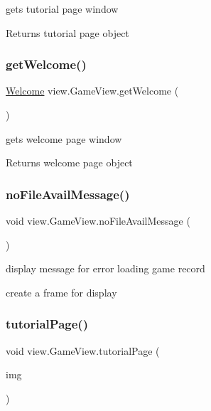 gets tutorial page window 

\begin{DoxyReturn}{Returns}
tutorial page object 
\end{DoxyReturn}
\hypertarget{classview_1_1_game_view_adaeb63e182332aee35ca0e0591332add}{}\label{classview_1_1_game_view_adaeb63e182332aee35ca0e0591332add} 
\subsubsection{\texorpdfstring{get\+Welcome()}{getWelcome()}}
{\footnotesize\ttfamily \hyperlink{classview_1_1_welcome}{Welcome} view.\+Game\+View.\+get\+Welcome (\begin{DoxyParamCaption}{ }\end{DoxyParamCaption})}



gets welcome page window 

\begin{DoxyReturn}{Returns}
welcome page object 
\end{DoxyReturn}
\hypertarget{classview_1_1_game_view_a7320789eb48e8b661a1f3a522ef592fb}{}\label{classview_1_1_game_view_a7320789eb48e8b661a1f3a522ef592fb} 
\subsubsection{\texorpdfstring{no\+File\+Avail\+Message()}{noFileAvailMessage()}}
{\footnotesize\ttfamily void view.\+Game\+View.\+no\+File\+Avail\+Message (\begin{DoxyParamCaption}{ }\end{DoxyParamCaption})}



display message for error loading game record 

create a frame for display \hypertarget{classview_1_1_game_view_a67fd4999f1be51ce360b8bba68e87d9c}{}\label{classview_1_1_game_view_a67fd4999f1be51ce360b8bba68e87d9c} 
\subsubsection{\texorpdfstring{tutorial\+Page()}{tutorialPage()}}
{\footnotesize\ttfamily void view.\+Game\+View.\+tutorial\+Page (\begin{DoxyParamCaption}\item[{Image\+Icon}]{img }\end{DoxyParamCaption})}



